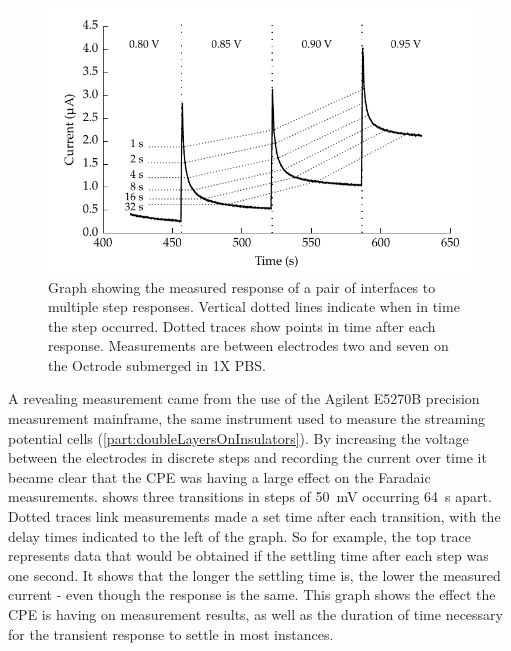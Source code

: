         \begin{figure}
          \centering
          \includegraphics{content/pt2/08-InterfaceParameters/graphics/graph_64s_stirred}
          \caption{\label{fig:pt2-faradaic_decay}Graph showing the measured response of a pair of interfaces to multiple step responses. Vertical dotted lines indicate when in time the step occurred. Dotted traces show points in time after each response. Measurements are between electrodes two and seven on the Octrode submerged in 1X PBS.}
        \end{figure}

        A revealing measurement came from the use of the Agilent E5270B precision measurement mainframe, the same instrument used to measure the streaming potential cells (\cref{part:doubleLayersOnInsulators}).
        By increasing the voltage between the electrodes in discrete steps and recording the current over time it became clear that the CPE was having a large effect on the Faradaic measurements.
         shows three transitions in steps of \SI{50}{\milli\volt} occurring \SI{64}{\second} apart.
        Dotted traces link measurements made a set time after each transition, with the delay times indicated to the left of the graph.
        So for example, the top trace represents data that would be obtained if the settling time after each step was one second.
        It shows that the longer the settling time is, the lower the measured current - even though the response is the same.
        This graph shows the effect the CPE is having on measurement results, as well as the duration of time necessary for the transient response to settle in most instances.

